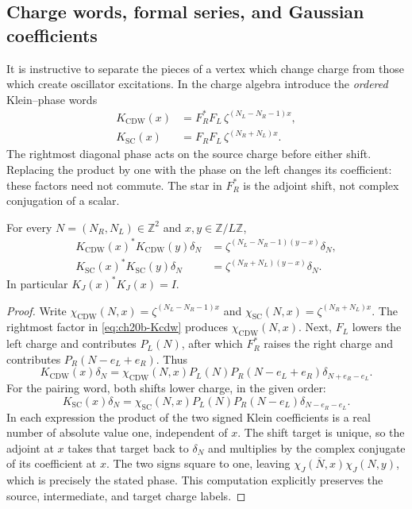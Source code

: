 \subsection{Charge words, formal series, and Gaussian coefficients}
\label{subsec:ch20b-formal}

It is instructive to separate the pieces of a vertex which change
charge from those which create oscillator excitations.  In the charge
algebra introduce the \emph{ordered} Klein--phase words
\begin{align}
 K_{\mathrm{CDW}}(x)
 &=F_R^*F_L\,\zeta^{(N_L-N_R-1)x},
 \label{eq:ch20b-Kcdw}\\
 K_{\mathrm{SC}}(x)
 &=F_RF_L\,\zeta^{(N_R+N_L)x}.
 \label{eq:ch20b-Ksc}
\end{align}
The rightmost diagonal phase acts on the source charge before either
shift.  Replacing the product by one with the phase on the left changes
its coefficient: these factors need not commute.  The star in
\(F_R^*\) is the adjoint shift, not complex conjugation of a scalar.

\begin{lemma}
\label{lem:ch20b-klein}
For every \(N=(N_R,N_L)\in\mathbb Z^2\) and \(x,y\in\mathbb Z/L\mathbb Z\),
\begin{align}
 K_{\mathrm{CDW}}(x)^*K_{\mathrm{CDW}}(y)\delta_N
 &=\zeta^{(N_L-N_R-1)(y-x)}\delta_N,
 \label{eq:ch20b-klein-cdw}\\
 K_{\mathrm{SC}}(x)^*K_{\mathrm{SC}}(y)\delta_N
 &=\zeta^{(N_R+N_L)(y-x)}\delta_N.
 \label{eq:ch20b-klein-sc}
\end{align}
In particular \(K_J(x)^*K_J(x)=I\).
\end{lemma}
\begin{proof}
Write \(\chi_{\mathrm{CDW}}(N,x)
=\zeta^{(N_L-N_R-1)x}\) and
\(\chi_{\mathrm{SC}}(N,x)=\zeta^{(N_R+N_L)x}\).
The rightmost factor in \eqref{eq:ch20b-Kcdw} produces
\(\chi_{\mathrm{CDW}}(N,x)\).  Next, \(F_L\) lowers the left
charge and contributes \(P_L(N)\), after which \(F_R^*\) raises the
right charge and contributes \(P_R(N-e_L+e_R)\).  Thus
\[
 K_{\mathrm{CDW}}(x)\delta_N
 =\chi_{\mathrm{CDW}}(N,x)
   P_L(N)P_R(N-e_L+e_R)
   \delta_{N+e_R-e_L}.
\]
For the pairing word, both shifts lower charge, in the given order:
\[
 K_{\mathrm{SC}}(x)\delta_N
 =\chi_{\mathrm{SC}}(N,x)
   P_L(N)P_R(N-e_L)
   \delta_{N-e_R-e_L}.
\]
In each expression the product of the two signed Klein coefficients
is a real number of absolute value one, independent of \(x\).
The shift target is unique, so the adjoint at \(x\) takes that target
back to \(\delta_N\) and multiplies by the complex conjugate of its
coefficient at \(x\).  The two signs square to one, leaving
\(\overline{\chi_J(N,x)}\chi_J(N,y)\), which is precisely the
stated phase.  This computation explicitly preserves the source,
intermediate, and target charge labels.
\end{proof}

